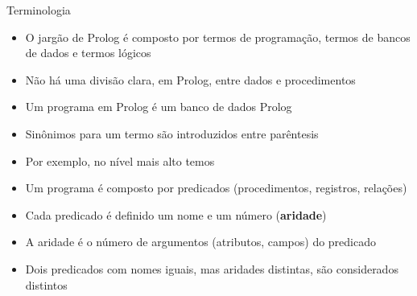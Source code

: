 \begin{frame}[fragile]{Terminologia}

    \begin{itemize}
        \item O jargão de Prolog é composto por termos de programação, termos de bancos de 
            dados e termos lógicos

        \item Não há uma divisão clara, em Prolog, entre dados e procedimentos

        \item Um programa em Prolog é um banco de dados Prolog

        \item Sinônimos para um termo são introduzidos entre parêntesis

        \item Por exemplo, no nível mais alto temos 

        \item Um programa é composto por predicados (procedimentos, registros, relações)

        \item Cada predicado é definido um nome e um número (\textbf{aridade})

        \item A aridade é o número de argumentos (atributos, campos) do predicado

        \item Dois predicados com nomes iguais, mas aridades distintas, são considerados 
            distintos
    \end{itemize}

\end{frame}

